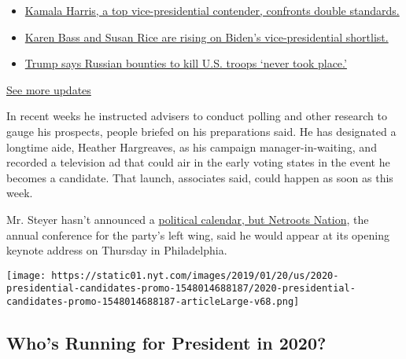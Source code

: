 \begin{itemize}
\tightlist
\item
  \href{https://www.nytimes.com/2020/07/31/us/elections/biden-vs-trump.html?action=click\&pgtype=Article\&state=default\&region=MAIN_CONTENT_1\&context=storylines_live_updates\#link-29fdff45}{Kamala
  Harris, a top vice-presidential contender, confronts double
  standards.}
\item
  \href{https://www.nytimes.com/2020/07/31/us/elections/biden-vs-trump.html?action=click\&pgtype=Article\&state=default\&region=MAIN_CONTENT_1\&context=storylines_live_updates\#link-13ec3d9c}{Karen
  Bass and Susan Rice are rising on Biden's vice-presidential
  shortlist.}
\item
  \href{https://www.nytimes.com/2020/07/31/us/elections/biden-vs-trump.html?action=click\&pgtype=Article\&state=default\&region=MAIN_CONTENT_1\&context=storylines_live_updates\#link-49e9a016}{Trump
  says Russian bounties to kill U.S. troops `never took place.'}
\end{itemize}

\href{https://www.nytimes.com/2020/07/31/us/elections/biden-vs-trump.html?action=click\&pgtype=Article\&state=default\&region=MAIN_CONTENT_1\&context=storylines_live_updates}{See
more updates}

In recent weeks he instructed advisers to conduct polling and other
research to gauge his prospects, people briefed on his preparations
said. He has designated a longtime aide, Heather Hargreaves, as his
campaign manager-in-waiting, and recorded a television ad that could air
in the early voting states in the event he becomes a candidate. That
launch, associates said, could happen as soon as this week.

Mr. Steyer hasn't announced a
\href{https://www.netrootsnation.org/keynotes/}{political calendar, but
Netroots Nation}, the annual conference for the party's left wing, said
he would appear at its opening keynote address on Thursday in
Philadelphia.

\href{https://www.nytimes.com/interactive/2019/us/politics/2020-presidential-candidates.html}{}

\texttt{[image: https://static01.nyt.com/images/2019/01/20/us/2020-presidential-candidates-promo-1548014688187/2020-presidential-candidates-promo-1548014688187-articleLarge-v68.png]}

\hypertarget{whos-running-for-president-in-2020}{%
\subsection{Who's Running for President in
2020?}\label{whos-running-for-president-in-2020}}

